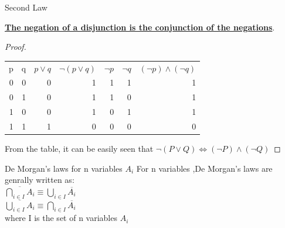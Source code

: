\documentclass{beamer}
\begin{document}
\begin{frame}{Second Law}

\textbf{\underline{The negation of a disjunction is the conjunction of the negations}}. \\
\begin{proof}
\begin{table}
\centering
\begin{tabular}{|r r r r r r r|}

p 	&q 	&$p \lor q$ 	&$\neg(p \lor q)$ 	&$\neg p$ 	&$\neg q$ 	&$(\neg p)\land(\neg q)$ \\
0 	&0 	&0 		&1 			&1 		&1 		&1 \\
0 	&1 	&0		&1 			&1 		&0 		&1 \\ 
1 	&0 	&0 		&1 			&0 		&1 		&1 \\
1 	&1 	&1 		&0 			&0 		&0 		&0

\end{tabular}
\end{table}
From the table, it can be easily seen that
$\neg(P\lor Q)\iff(\neg P)\land(\neg Q)$

\end{proof}
\end{frame}

\begin{frame}{De Morgan's laws for n variables $A_i$}
For n variables ,De Morgan's laws are genrally written as:
\\
    $\overline{\bigcap_{i \in I} A_{i}}\equiv \bigcup_{i \in I} \overline{A_{i}}$ \\

    $\overline{\bigcup_{i \in I} A_{i}}\equiv 	\bigcap_{i \in I} \overline{A_{i}}$
\\
where I is the set of n variables $A_i$
\end{frame}
\end{document}
